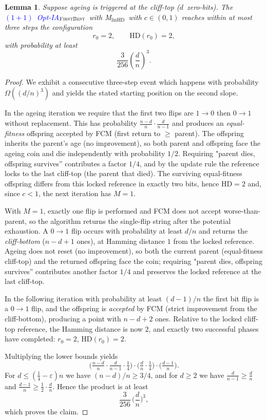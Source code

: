 \documentclass[lettersize,journal]{IEEEtran}
\newcommand{\rev}[1]{\textcolor{blue}{#1}}
\newcommand{\HD}{\text{HD}}
\newcommand{\linHD}{M$_{\text{linHD}}$}
\newcommand{\firstBest}{$(1+1)$~Opt-IA$_{\textsc{FirstBest}}$}
\newtheorem{lemma}{Lemma}
\begin{document}
{\begin{lemma}\label{lem:can-start-omega-d3}
	Suppose ageing is triggered at the cliff-top ($d$~zero-bits).  
	The \rev{\firstBest}~with \linHD\ with $c\in(0,1)$ reaches within at most three steps the 
	configuration
	\[
	r_0=2, \qquad \mathrm{HD}(r_0)=2,
	\]
	with probability at least 
	\[
	\frac{3}{256}\left(\frac{d}{n}\right)^3.
	\]
\end{lemma}

\begin{proof}
	We exhibit a consecutive three-step event which happens with probability $\Omega((d/n)^3)$ and yields the stated starting 
	position on the second slope.
	
	 In the ageing iteration we require that the first two flips are $1\!\to 0$ then $0\!\to 1$ without replacement. This has probability $\frac{n-d}{n}\cdot\frac{d}{n-1}$ and produces an \emph{equal-fitness} offspring accepted by FCM (first return to $\ge$ parent). The offspring inherits the parent's age (no improvement), so both parent and offspring face the ageing coin and die independently with probability $1/2$. Requiring "parent dies, offspring survives'' contributes a factor $1/4$, and by the update rule the reference locks to the last cliff-top (the parent that died). The surviving equal-fitness offspring differs from this locked reference in exactly two bits, hence $\HD=2$ and, since $c<1$, the next iteration has $M=1$.
		
 With $M=1$, exactly one flip is performed and FCM does not accept worse-than-parent, so the algorithm returns the single-flip string after the potential exhaustion. A $0\!\to 1$ flip occurs with probability at least $d/n$ and returns the \emph{cliff-bottom} ($n-d+1$ ones), at Hamming distance $1$ from the locked reference. Ageing does not reset (no improvement), so both the current parent (equal-fitness cliff-top) and the returned offspring face the coin; requiring "parent dies, offspring survives'' contributes another factor $1/4$ and preserves the locked reference at the last cliff-top.
	
 In the following iteration with probability at least $(d-1)/n$ the first bit flip is a $0\!\to 1$ flip, and the offspring is \emph{accepted} by FCM (strict improvement from the cliff-bottom), producing a point with $n-d+2$ ones. Relative to the locked cliff-top reference, the Hamming distance is now $2$, and exactly two successful phases have completed: $r_0=2$, $\HD(r_0)=2$.
	
	Multiplying the lower bounds yields
	\[
	\Big(\tfrac{n-d}{n}\cdot\tfrac{d}{n-1}\cdot\tfrac14\Big)\cdot
	\Big(\tfrac{d}{n}\cdot\tfrac14\Big)\cdot
	\Big(\tfrac{d-1}{n}\Big).
	\]
	For $d\le(\tfrac14-\varepsilon)n$ we have $(n-d)/n\ge 3/4$, and for $d\ge 2$ we have $\tfrac{d}{n-1}\ge\tfrac{d}{n}$ and $\tfrac{d-1}{n}\ge \tfrac12\cdot\tfrac{d}{n}$. Hence the product is at least
	\[
	\frac{3}{256}\,\Big(\frac{d}{n}\Big)^{\!3},
	\]
	which proves the claim.
\end{proof}

}
\end{document}
